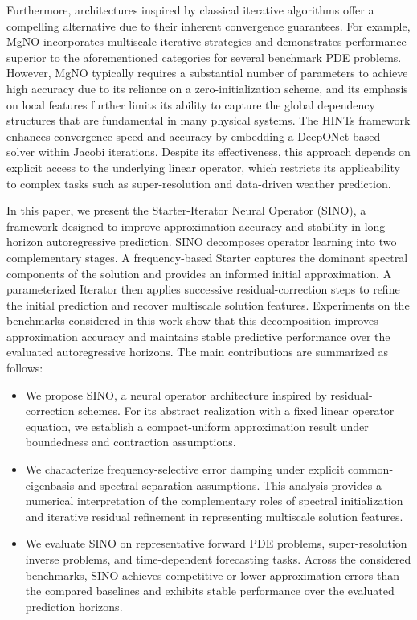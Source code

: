 \documentclass[preprint,numbers,sort&compress]{elsarticle}
\begin{document}
		Furthermore, architectures inspired by classical iterative algorithms offer a compelling alternative due to their inherent convergence guarantees. For example, MgNO \cite{he2024mgno, he2026self} incorporates multiscale iterative strategies and demonstrates performance superior to the aforementioned categories for several benchmark PDE problems.  However, MgNO typically requires a substantial number of parameters to achieve high accuracy due to its reliance on a zero-initialization scheme, and its emphasis on local features further limits its ability to capture the global dependency structures that are fundamental in many physical systems. The HINTs \cite{zhang2024blending} framework enhances convergence speed and accuracy by embedding a DeepONet-based solver within Jacobi iterations. Despite its effectiveness, this approach depends on explicit access to the underlying linear operator, which restricts its applicability to complex tasks such as super-resolution and data-driven weather prediction.
		
		
		In this paper, we present the Starter-Iterator Neural Operator (SINO), a
		framework designed to improve approximation accuracy and stability in
		long-horizon autoregressive prediction. SINO decomposes operator learning
		into two complementary stages. A frequency-based Starter captures the
		dominant spectral components of the solution and provides an informed initial approximation. A parameterized Iterator then applies successive
		residual-correction steps to refine the initial prediction and recover
		multiscale solution features. Experiments on the benchmarks considered in
		this work show that this decomposition improves approximation accuracy and
		maintains stable predictive performance over the evaluated autoregressive
		horizons. The main contributions are summarized as follows:   
		\begin{itemize}
			\item  We propose SINO, a neural operator architecture inspired by residual-correction schemes. For its abstract realization with a fixed linear operator equation, we establish a compact-uniform approximation result under boundedness and contraction assumptions.
			
			\item We characterize frequency-selective error damping under explicit common-eigenbasis and spectral-separation assumptions. This analysis provides a numerical interpretation of the complementary roles of spectral initialization and iterative residual refinement in representing multiscale solution features.
			
			\item We evaluate SINO on representative forward PDE problems, super-resolution inverse problems, and time-dependent forecasting tasks. Across the considered benchmarks, SINO achieves competitive or lower approximation errors than the compared baselines and exhibits stable performance over the evaluated prediction horizons.
		\end{itemize}
		
\end{document}
